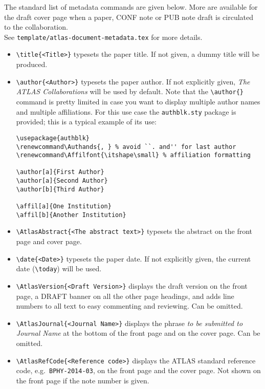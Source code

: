\documentclass[koma,UKenglish]{style/atlasdoc}
\begin{document}
The standard list of metadata commands are given below.
More are available for the draft cover page when a paper, CONF note or PUB note draft
is circulated to the collaboration.\\ 
See \texttt{template/atlas-document-metadata.tex} for more details.

\begin{itemize}
  \item {\verb|\title{<Title>}|} typesets the paper title. If not
    given, a dummy title will be produced.

  \item {\verb|\author{<Author>}|} typesets the paper author. If not
    explicitly given, \emph{The ATLAS Collaborations} will be used by
    default. Note that the \verb|\author{}| command is pretty limited
    in case you want to display multiple author names and multiple
    affiliations. For this use case the \verb|authblk.sty| package is
    provided; this is a typical example of its use:
    \begin{verbatim}
\usepackage{authblk}
\renewcommand\Authands{, } % avoid ``. and'' for last author
\renewcommand\Affilfont{\itshape\small} % affiliation formatting

\author[a]{First Author}
\author[a]{Second Author}
\author[b]{Third Author}

\affil[a]{One Institution}
\affil[b]{Another Institution}
    \end{verbatim}

  \item {\verb|\AtlasAbstract{<The abstract text>}|} typesets the
    abstract on the front page and cover page.

  \item {\verb|\date{<Date>}|} typesets the paper date. If not
    explicitly given, the current date (\verb|\today|) will be used.

  \item {\verb|\AtlasVersion{<Draft Version>}|} displays the draft
    version on the front page, a DRAFT banner on all the other page
    headings, and adds line numbers to all text to easy commenting and
    reviewing. Can be omitted.

  \item {\verb|\AtlasJournal{<Journal Name>}|} displays the phrase \emph{to
    be submitted to Journal Name} at the bottom of the front page and
    on the cover page. Can be omitted.

  \item {\verb|\AtlasRefCode{<Reference code>}|} displays the ATLAS
    standard reference code, e.g.\ \texttt{BPHY-2014-03}, on the front page and
    the cover page. Not shown on the front page if the note number is given.


\end{itemize}
\end{document}
